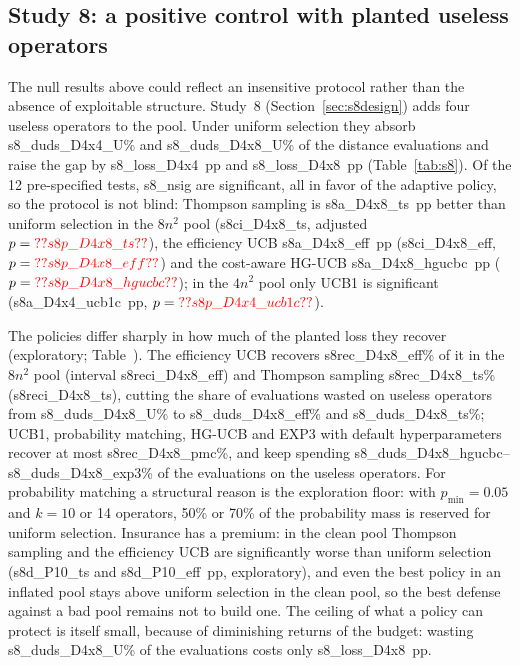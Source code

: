 
\subsection{Study 8: a positive control with planted useless operators}\label{sec:s8}
The null results above could reflect an insensitive protocol rather than the absence of exploitable structure. Study~8 (Section~\ref{sec:s8design}) adds four useless operators to the pool. Under uniform selection they absorb \num{s8_duds_D4x4_U}\% and \num{s8_duds_D4x8_U}\% of the distance evaluations and raise the gap by \num{s8_loss_D4x4}~pp and \num{s8_loss_D4x8}~pp (Table~\ref{tab:s8}). Of the 12 pre-specified tests, \num{s8_nsig} are significant, all in favor of the adaptive policy, so the protocol is not blind: Thompson sampling is \num{s8a_D4x8_ts}~pp better than uniform selection in the $8n^2$ pool (\num{s8ci_D4x8_ts}, adjusted $p=\num{s8p_D4x8_ts}$), the efficiency UCB \num{s8a_D4x8_eff}~pp (\num{s8ci_D4x8_eff}, $p=\num{s8p_D4x8_eff}$) and the cost-aware HG-UCB \num{s8a_D4x8_hgucbc}~pp ($p=\num{s8p_D4x8_hgucbc}$); in the $4n^2$ pool only UCB1 is significant (\num{s8a_D4x4_ucb1c}~pp, $p=\num{s8p_D4x4_ucb1c}$).



The policies differ sharply in how much of the planted loss they recover (exploratory; Table~). The efficiency UCB recovers \num{s8rec_D4x8_eff}\% of it in the $8n^2$ pool (interval \num{s8reci_D4x8_eff}) and Thompson sampling \num{s8rec_D4x8_ts}\% (\num{s8reci_D4x8_ts}), cutting the share of evaluations wasted on useless operators from \num{s8_duds_D4x8_U}\% to \num{s8_duds_D4x8_eff}\% and \num{s8_duds_D4x8_ts}\%; UCB1, probability matching, HG-UCB and EXP3 with default hyperparameters recover at most \num{s8rec_D4x8_pmc}\%, and keep spending \num{s8_duds_D4x8_hgucbc}--\num{s8_duds_D4x8_exp3}\% of the evaluations on the useless operators. For probability matching a structural reason is the exploration floor: with $p_{\min}=0.05$ and $k=10$ or 14 operators, 50\% or 70\% of the probability mass is reserved for uniform selection. Insurance has a premium: in the clean pool Thompson sampling and the efficiency UCB are significantly worse than uniform selection (\num{s8d_P10_ts} and \num{s8d_P10_eff}~pp, exploratory), and even the best policy in an inflated pool stays above uniform selection in the clean pool, so the best defense against a bad pool remains not to build one. The ceiling of what a policy can protect is itself small, because of diminishing returns of the budget: wasting \num{s8_duds_D4x8_U}\% of the evaluations costs only \num{s8_loss_D4x8}~pp.


